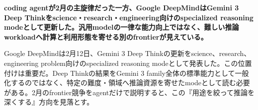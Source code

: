 \noindent\textbf{coding agentが2月の主旋律だった一方、Google DeepMindはGemini 3 Deep Thinkをscience・research・engineering向けのspecialized reasoning modeとして更新した。汎用modelの一律な能力向上ではなく、難しい推論workloadへ計算と利用形態を寄せる別のfrontierが見えている。}\autocite{src-dd5d9b8662f3}

Google DeepMindは2月12日、Gemini 3 Deep Thinkの更新をscience、research、engineering problem向けのspecialized reasoning modeとして発表した。この位置付けは重要だ。Deep Thinkの結果をGemini 3 family全体の標準能力として一般化するのではなく、特定の難度・領域へ推論資源を寄せたmodeとして読む必要がある。2月のfrontier競争をagentだけで説明すると、この『用途を絞って推論を深くする』方向を見落とす。\autocite{src-dd5d9b8662f3}


